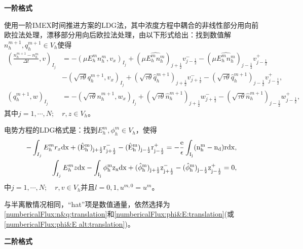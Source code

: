 \noindent \textbf{一阶格式}

使用一阶IMEX时间推进方案的LDG法，其中浓度方程中耦合的非线性部分用向前欧拉法处理，漂移部分用向后欧拉法处理，由以下形式给出：找到数值解$n_h^{m+1},q_h^{m+1}\in V_h$使得
\begin{align}
    (\frac{n_h^{m+1} - n_h^m}{\Delta t},v)_{I_j} & = -(\mu E_h^mn_h^m, v_x)_{I_j} + (\mu \hat{E_h^mn_h^m})_{j+\frac{1}{2}}v_{j-\frac{1}{2}}^- - (\mu\hat{E_h^mn_h^m})_{j-\frac{1}{2}}v^+_{j-\frac{1}{2}}                                         \nonumber                               \\
                                                 & -(\sqrt{\tau \theta}q_h^{m+1},v_x)_{I_j} + (\sqrt{\tau \theta}\hat{q}_h^{m+1})_{j+\frac{1}{2}}v_{j+\frac{1}{2}}^- - (\sqrt{\tau \theta}\hat{q}_h^{m+1})_{j-\frac{1}{2}}v_{j-\frac{1}{2}}^+,  \label{weakForm:IMEX1 LDG 1:translation} \\
    (q_h^{m+1},w)_{I_j}                          & = -(\sqrt{\tau \theta}n_h^{m+1},w_x)_{I_j} + (\sqrt{\tau \theta}\hat{n}_h^{m+1})_{j+\frac{1}{2}}w_{j+\frac{1}{2}}^- - (\sqrt{\tau \theta}\hat{n}_h^{m+1})_{j-\frac{1}{2}}w_{j-\frac{1}{2}}^+,\label{weakForm:IMEX1 LDG 2:translation}
\end{align}
其中$j = 1,\cdots,N;\quad r,z \in V_h$。

电势方程的LDG格式是：找到$E_h^{m},\phi_h^{m} \in V_h$，使得
\begin{align}
    -\int_{I_j} E_h^{m}r_x \rm{d}x + (\hat{E}_h^{m})_{j+\frac{1}{2}}r_{j+\frac{1}{2}}^- - (\hat{E}_h^{m})_{j-\frac{1}{2}}r_{j-\frac{1}{2}}^+ = -\frac{e}{\epsilon}\int_{I_j}(n_h^{m} - n_d) r\rm{d} x, \label{equation:IMEX1 LDG:EPE 1:translation} \\
    \int_{I_j} E_h^{m}z \rm{d}x - \int_{I_j} \phi_h^{m}z_x \rm{d}x  + (\hat{\phi}_h^{m})_{j+\frac{1}{2}}z^-_{j+\frac{1}{2}} - (\hat{\phi}_h^{m})_{j-\frac{1}{2}}z_{j-\frac{1}{2}}^+  = 0,\label{equation:IMEX1 LDG:EPE 2:translation}
\end{align}
中$j = 1,\cdots,N;\quad r,v \in V_h$并且$l = 0,1, u^{m,0} = u^m$。

与半离散情况相同，“hat”项是数值通量，依然选择为\eqref{numbericalFlux:n&q:translation}和\eqref{numbericalFlux:phi&E:translation}(或\eqref{numbericalFlux:phi&E alt:translation})。

\noindent \textbf{二阶格式}

